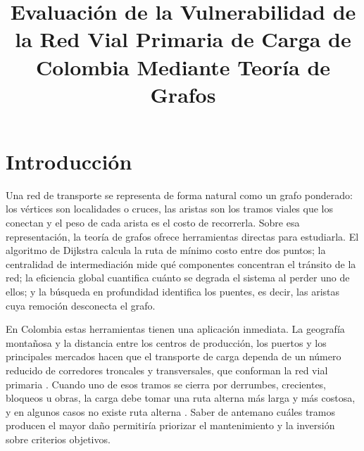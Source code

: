 \documentclass[conference]{IEEEtran}
\begin{document}
\title{Evaluación de la Vulnerabilidad de la Red Vial Primaria de Carga de Colombia Mediante Teoría de Grafos}

\author{
}

\maketitle


\section{Introducción}
Una red de transporte se representa de forma natural como un
grafo ponderado: los vértices son localidades o cruces, las aristas son los
tramos viales que los conectan y el peso de cada arista es el costo de
recorrerla. Sobre esa representación, la teoría de grafos ofrece herramientas
directas para estudiarla. El algoritmo de Dijkstra \cite{dijkstra1959} calcula
la ruta de mínimo costo entre dos puntos; la centralidad de intermediación
\cite{brandes2001} mide qué componentes concentran el tránsito de la red; la
eficiencia global \cite{latora2001} cuantifica cuánto se degrada el sistema al
perder uno de ellos; y la búsqueda en profundidad \cite{tarjan1972} identifica
los puentes, es decir, las aristas cuya remoción desconecta el grafo.
 
En Colombia estas herramientas tienen una aplicación inmediata. La geografía
montañosa y la distancia entre los centros de producción, los puertos y los
principales mercados hacen que el transporte de carga dependa de un número
reducido de corredores troncales y transversales, que conforman la red vial
primaria \cite{invias_opendata}. Cuando uno de esos tramos se cierra por
derrumbes, crecientes, bloqueos u obras, la carga debe tomar una ruta alterna
más larga y más costosa, y en algunos casos no existe ruta alterna
\cite{cambio_radiografia}. Saber de antemano cuáles tramos producen el mayor
daño permitiría priorizar el mantenimiento y la inversión sobre criterios
objetivos.
 
\end{document}
